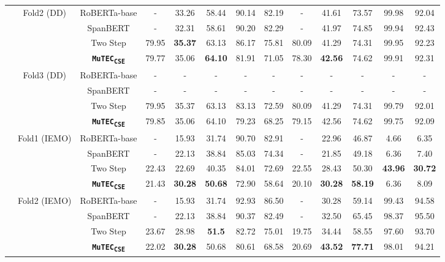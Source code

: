 \documentclass{article}
\newcommand{\subone}{\textbf{\texttt{MuTEC\textsubscript{CSE}}}}
\begin{document}
{\begin{table*}[!t]
{\begin{tabular}{|c|c|c|c|c|c|c|c|c|c|c|c|c|}
\cline{2-13} 
& \multirow{4}{*}{Fold2 (DD)}  
& RoBERTa-base  & 
- & 33.26 & 58.44 & 90.14 & 82.19 & - & 41.61 & 73.57 & 99.98 & 92.04 \\ \cline{3-13} 
&  & SpanBERT &
- & 32.31 & 58.61 & 90.20 & 82.29 & - & 41.97 & 74.85 & 99.94 & 92.43 \\ \cline{3-13} 
&  & Two Step  &  
79.95 & \textbf{35.37} &  63.13 &  86.17 & 75.81 & 80.09 & 41.29 & 74.31 & 99.95 & 92.23  \\
\cline{3-13} 
&  & \subone  &  
79.77 & 35.06 &  \textbf{64.10} &  81.91 & 71.05 & 78.30 & \textbf{42.56} & 74.62 & 99.91 & 92.31  \\
\cline{2-13} 
& \multirow{4}{*}{Fold3 (DD)} 
& RoBERTa-base  & 
- & -  & -     & -     & -     & -  &  -     & -     & -     & -     \\ \cline{3-13} 
&  & SpanBERT & 
- &     -  & -     & -     & -     & - &   -    & -     & -     & -     \\ \cline{3-13} 
&  & Two Step &     
79.95 & 35.37  & 63.13  &  83.13 &  72.59 &  80.09  & 41.29 & 74.31 & 99.79 & 92.01       \\ 
\cline{3-13} 
&  & \subone &     
79.85 & 35.06  & 64.10 & 79.23 &  68.25 &  79.15  & 42.56 & 74.62 & 99.75 & 92.09       \\
\cline{2-13} 
& \multirow{4}{*}{Fold1 (IEMO)} 
& RoBERTa-base  &
- & 15.93 & 31.74 & 90.70 & 82.91 & - & 22.96 & 46.87 & 4.66 & 6.35 \\ \cline{3-13} 
&  & SpanBERT &
- & 22.13 & 38.84 & 85.03 & 74.34 & - & 21.85 & 49.18 & 6.36 & 7.40 \\ \cline{3-13} 
& & Two Step  &     
22.43 & 22.69  & 40.35 & 84.01 & 72.69 & 22.55 & 28.43 & 50.30 & \textbf{43.96} & \textbf{30.72} \\
\cline{3-13} 
& & \subone  &     
21.43 & \textbf{30.28}  &  \textbf{50.68} & 72.90 & 58.64 &   20.10 & \textbf{30.28} & \textbf{58.19} & 6.36 & 8.09 \\
\cline{2-13} 
& \multirow{3}{*}{Fold2 (IEMO)} 
& RoBERTa-base  & 
- & 15.93 & 31.74 & 92.93 & 86.50 & - & 30.28 & 59.14 & 99.43 & 94.58      \\ \cline{3-13} 
&  & SpanBERT & 
- &  22.13 & 38.84 & 90.37 & 82.49 & - & 32.50 & 65.45 & 98.37 & 95.50       \\ 
\cline{3-13} 
&  & Two Step &   
23.67 & 28.98 & \textbf{51.5}  & 82.72   & 75.01  & 19.75 & 34.44 &  58.55 &  97.60 & 93.70       \\ 
\cline{3-13} 
&  & \subone &   
22.02 & \textbf{30.28} & 50.68  & 80.61  & 68.58  & 20.69 & \textbf{43.52} &  \textbf{77.71} &  98.01 & 94.21       \\

\end{tabular}}
\end{table*}}
\end{document}
